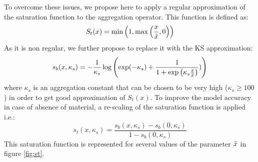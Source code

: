  To overcome these issues, we propose here to apply a regular approximation of the saturation function to the aggregation operator. This function is defined as:
 \begin{equation}
     \label{eq:satf}
     S_t(x)=\min{\left( 1, \max{\left( \frac{x}{\Tilde{x}},0\right)}\right)}
 \end{equation}
 As it is non regular, we further propose to replace it with the KS approximation:
 \begin{equation}
    s_b(x,\kappa_s)= -\frac{1}{\kappa_s}\log{\left(\exp(-\kappa_s)+\frac{1}{1+\exp{\left(\kappa_s\frac{x}{\Tilde{x}}\right)}})\right)}
 \end{equation}
 where $\kappa_s$ is an aggregation constant that can be chosen to be very high ($\kappa_s \geq 100$) in order to get good approximation of $S_t(x)$. To improve the model accuracy in case of absence of material, a re-scaling of the saturation function is applied i.e.:
 \begin{equation}
 \label{eq:st}
     s_t(x,\kappa_s)=\frac{s_b(x,\kappa_s)-s_b(0,\kappa_s)}{1-s_b(0,\kappa_s)}
 \end{equation}
 This saturation function is represented for several values of the parameter $\Tilde{x}$ in figure \ref{fig:st}.

